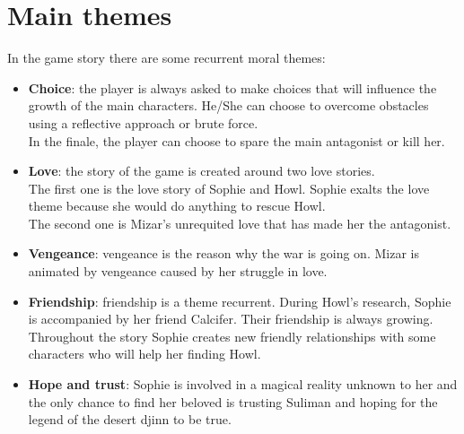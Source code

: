 \pagebreak %

\section{Main themes}

In the game story there are some recurrent moral themes:

\begin{itemize}
\item \textbf{Choice}: the player is always asked to make choices that will influence the growth of the main characters. He/She can choose to overcome obstacles using a reflective approach or brute force. \\
  In the finale, the player can choose to spare the main antagonist or kill her.

\item \textbf{Love}: the story of the game is created around two love stories. \\
  The first one is the love story of Sophie and Howl. Sophie exalts the love theme because she would do anything to rescue Howl. \\
  The second one is Mizar’s unrequited love that has made her the antagonist.

\item \textbf{Vengeance}: vengeance is the reason why the war is going on. Mizar is animated by vengeance caused by her struggle in love.


\item \textbf{Friendship}: friendship is a theme recurrent. During Howl's research, Sophie is accompanied by her friend Calcifer. Their friendship is always growing. Throughout the story Sophie creates new friendly relationships with some characters who will help her finding Howl.

\item \textbf{Hope and trust}: Sophie is involved in a magical reality unknown to her and the only chance to find her beloved is trusting Suliman and hoping for the legend of the desert djinn  to be true.

\end{itemize}
